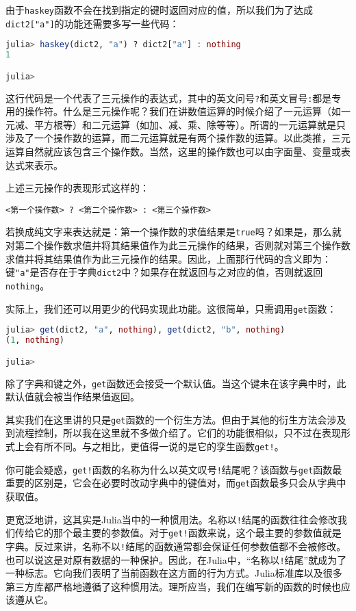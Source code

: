 由于\verb`haskey`函数不会在找到指定的键时返回对应的值，所以我们为了达成\verb`dict2["a"]`的功能还需要多写一些代码：
\begin{lstlisting}[language=julia]
julia> haskey(dict2, "a") ? dict2["a"] : nothing
1

julia> 
\end{lstlisting}

这行代码是一个代表了三元操作的表达式，其中的英文问号\verb`?`和英文冒号\verb`:`都是专用的操作符。什么是三元操作呢？我们在讲数值运算的时候介绍了一元运算（如一元减、平方根等）和二元运算（如加、减、乘、除等等）。所谓的一元运算就是只涉及了一个操作数的运算，而二元运算就是有两个操作数的运算。以此类推，三元运算自然就应该包含三个操作数。当然，这里的操作数也可以由字面量、变量或表达式来表示。

上述三元操作的表现形式这样的：
\begin{lstlisting}[language=none]
<第一个操作数> ? <第二个操作数> : <第三个操作数>
\end{lstlisting}


若换成纯文字来表达就是：第一个操作数的求值结果是\verb`true`吗？如果是，那么就对第二个操作数求值并将其结果值作为此三元操作的结果，否则就对第三个操作数求值并将其结果值作为此三元操作的结果。因此，上面那行代码的含义即为：键\verb`"a"`是否存在于字典\verb`dict2`中？如果存在就返回与之对应的值，否则就返回\verb`nothing`。

实际上，我们还可以用更少的代码实现此功能。这很简单，只需调用\verb`get`函数：
\begin{lstlisting}[language=julia]
julia> get(dict2, "a", nothing), get(dict2, "b", nothing)
(1, nothing)

julia> 
\end{lstlisting}

除了字典和键之外，\verb`get`函数还会接受一个默认值。当这个键未在该字典中时，此默认值就会被当作结果值返回。

其实我们在这里讲的只是\verb`get`函数的一个衍生方法。但由于其他的衍生方法会涉及到流程控制，所以我在这里就不多做介绍了。它们的功能很相似，只不过在表现形式上会有所不同。与之相比，更值得一说的是它的孪生函数\verb`get!`。

你可能会疑惑，\verb`get!`函数的名称为什么以英文叹号\verb`!`结尾呢？该函数与\verb`get`函数最重要的区别是，它会在必要时改动字典中的键值对，而\verb`get`函数最多只会从字典中获取值。

更宽泛地讲，这其实是Julia当中的一种惯用法。名称以\verb`!`结尾的函数往往会修改我们传给它的那个最主要的参数值。对于\verb`get!`函数来说，这个最主要的参数值就是字典。反过来讲，名称不以\verb`!`结尾的函数通常都会保证任何参数值都不会被修改。也可以说这是对原有数据的一种保护。因此，在Julia中，“名称以\verb`!`结尾”就成为了一种标志。它向我们表明了当前函数在这方面的行为方式。Julia标准库以及很多第三方库都严格地遵循了这种惯用法。理所应当，我们在编写新的函数的时候也应该遵从它。

